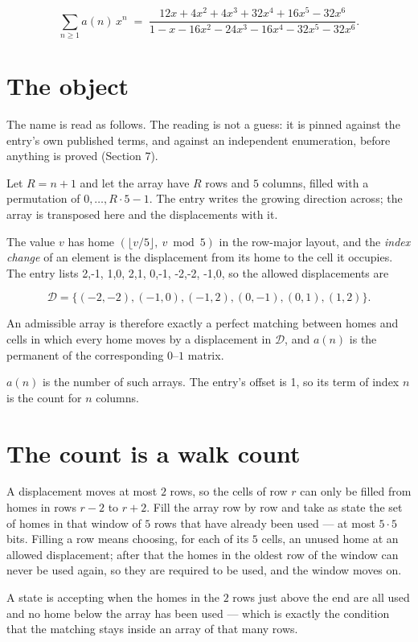 \documentclass[11pt]{article}
\theoremstyle{definition}
\begin{document}
\[\sum_{n \ge 1} a(n)\,x^n \;=\; \frac{12x + 4x^{2} + 4x^{3} + 32x^{4} + 16x^{5} - 32x^{6}}{1 - x - 16x^{2} - 24x^{3} - 16x^{4} - 32x^{5} - 32x^{6}}.\]

\section{The object}

The name is read as follows. The reading is not a guess: it is pinned against the entry's own published terms, and against an independent enumeration, before anything is proved (Section 7).

Let $R = n + 1$ and let the array have $R$ rows and $5$ columns, filled with a permutation of $0,\dots,R\cdot5-1$. The entry writes the growing direction across; the array is transposed here and the displacements with it.

The value $v$ has home $(\lfloor v/5\rfloor,\ v \bmod 5)$ in the row-major layout, and the {\itshape index change} of an element is the displacement from its home to the cell it occupies. The entry lists 2,-1, 1,0, 2,1, 0,-1, -2,-2, -1,0, so the allowed displacements are

\[\mathcal{D} = \{(-2,-2), (-1,0), (-1,2), (0,-1), (0,1), (1,2)\}.\]

An admissible array is therefore exactly a perfect matching between homes and cells in which every home moves by a displacement in $\mathcal{D}$, and $a(n)$ is the permanent of the corresponding $0$--$1$ matrix.

$a(n)$ is the number of such arrays. The entry's offset is 1, so its term of index $n$ is the count for $n$ columns.

\section{The count is a walk count}

A displacement moves at most $2$ rows, so the cells of row $r$ can only be filled from homes in rows $r-2$ to $r+2$. Fill the array row by row and take as state the set of homes in that window of $5$ rows that have already been used --- at most $5\cdot5$ bits. Filling a row means choosing, for each of its $5$ cells, an unused home at an allowed displacement; after that the homes in the oldest row of the window can never be used again, so they are required to be used, and the window moves on.

A state is accepting when the homes in the $2$ rows just above the end are all used and no home below the array has been used --- which is exactly the condition that the matching stays inside an array of that many rows.
\end{document}

